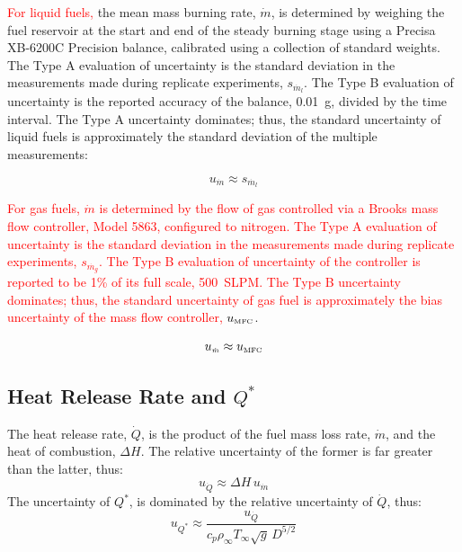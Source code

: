 \documentclass[12pt]{article}
\begin{document}
\textcolor{red}{For liquid fuels,} the mean mass burning rate, $\dot{m}$, is determined by weighing the fuel reservoir at the start and end of the steady burning stage using a Precisa XB-6200C Precision balance, calibrated using a collection of standard weights. The Type A evaluation of uncertainty is the standard deviation in the measurements made during replicate experiments, $s_{\scriptscriptstyle \dot{m_l}}$. The Type B evaluation of uncertainty is the reported accuracy of the balance, 0.01~g, divided by the time interval. The Type A uncertainty dominates; thus, the standard uncertainty of liquid fuels is approximately the standard deviation of the multiple measurements:

\begin{equation}
\label{eq:mass_rate_uncertainty_liquid}
u_{\scriptscriptstyle \dot{m}} \approx s_{\scriptscriptstyle \dot{m_l} }
\end{equation}

\textcolor{red}{For gas fuels, $\dot{m}$ is determined by the flow of gas controlled via a Brooks mass flow controller, Model 5863, configured to nitrogen. The Type A evaluation of uncertainty is the standard deviation in the measurements made during replicate experiments, $s_{\scriptscriptstyle \dot{m_g}}$. The Type B evaluation of uncertainty of the controller is reported to be 1\% of its full scale, 500~SLPM. The Type B uncertainty dominates; thus, the standard uncertainty of gas fuel is approximately the bias uncertainty of the mass flow controller, $u_{\scriptscriptstyle {\rm{MFC}}}$}.

\begin{equation}
\label{eq:mass_rate_uncertainty_gas}
u_{\scriptscriptstyle \dot{m}} \approx u_{\scriptscriptstyle {\rm{MFC}}}
\end{equation}



\subsection{Heat Release Rate and $Q^*$ }
\label{ssec:Heat_Release_Rate}

The heat release rate, $\dot{Q}$, is the product of the fuel mass loss rate, $\dot{m}$, and the heat of combustion, $\Delta H$. The relative uncertainty of the former is far greater than the latter, thus:
\begin{equation}
\label{eq:heat_release_rate_uncertainty}
u_{\scriptscriptstyle \dot{Q}} \approx \Delta H \, u_{\dot{m}}
\end{equation}
The uncertainty of ${Q^*}$, is dominated by the relative uncertainty of $\dot{Q}$, thus:
\begin{equation}
\label{eq:Q*_uncertainty}
u_{\scriptscriptstyle {Q^*}} \approx \frac{u_{\scriptscriptstyle \dot{Q}}}{c_{p}\rho_\infty T_\infty \sqrt{g} \, D^{5/2}}
\end{equation}
\end{document}
